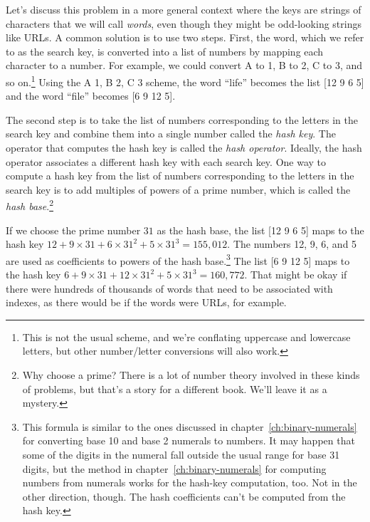 Let's discuss this problem in a more general context
where the keys are strings of characters that we will
call \emph{words}, even though they might be odd-looking
strings like URLs.
A common solution is to use two steps. First, the word,
which we refer to as the search key, is converted
into a list of numbers by mapping each character to a number. For
example, we could convert A to 1, B to 2, C to 3,
and so on.\footnote{This is not the usual scheme,
and we're conflating uppercase and
lowercase letters, but other number/letter conversions  will also work.}
Using the A 1, B 2, C 3 scheme, the word ``life'' becomes the list
\textsf{[12 9 6 5]}
and the word ``file'' becomes \textsf{[6 9 12 5]}.

The second step is to take the list of numbers corresponding
to the letters in the search key
and combine them into a single number called
the \emph{hash key}.
The operator that computes the hash key is called
the \emph{hash operator}.
Ideally, the hash operator associates a different hash key
with each search key.
One way to compute a hash key from the list of numbers
corresponding to the letters in the search key is
to add multiples of powers of a
prime number, which is called the
\emph{hash base}.\footnote{Why choose a prime?
There is a lot of number theory involved in these kinds
of problems, but that's a story for a different book.
We'll leave it as a mystery.}

If we choose the prime number $31$
as the hash base, the list \textsf{[12 9 6 5]} maps to the hash key
$12 + 9\times31 + 6\times31^2 + 5\times31^3 = 155{,}012$.
The numbers 12, 9, 6, and 5 are used as coefficients to powers of
the hash base.\footnote{This formula is similar to the
ones discussed in
chapter~\ref{ch:binary-numerals}
for converting base 10 and base 2 numerals to numbers.
It may happen that some of the digits in the numeral
fall outside the usual range for base 31 digits,
but the method in chapter~\ref{ch:binary-numerals}
for computing numbers from numerals works
for the hash-key computation, too. Not in the other direction, though.
The hash coefficients can't be computed from the hash key.}
The list \textsf{[6 9 12 5]} maps to the hash key
$6 + 9\times31 + 12\times31^2 + 5\times31^3 = 160{,}772$.
That might be okay if there were hundreds of thousands of words
that need to be associated with indexes, as there would be
if the words were URLs, for example.

